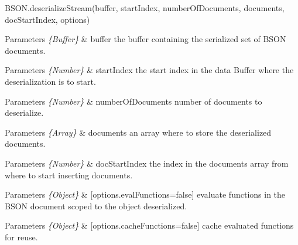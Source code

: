 \begin{DoxyItemize}
\item {\ttfamily B\+S\+O\+N.\+deserialize\+Stream(buffer, start\+Index, number\+Of\+Documents, documents, doc\+Start\+Index, options)}
\begin{DoxyItemize}
\item 
\begin{DoxyParams}{Parameters}
{\em \{\+Buffer\}} & buffer the buffer containing the serialized set of B\+S\+ON documents.\\
\hline
\end{DoxyParams}

\item 
\begin{DoxyParams}{Parameters}
{\em \{\+Number\}} & start\+Index the start index in the data Buffer where the deserialization is to start.\\
\hline
\end{DoxyParams}

\item 
\begin{DoxyParams}{Parameters}
{\em \{\+Number\}} & number\+Of\+Documents number of documents to deserialize.\\
\hline
\end{DoxyParams}

\item 
\begin{DoxyParams}{Parameters}
{\em \{\+Array\}} & documents an array where to store the deserialized documents.\\
\hline
\end{DoxyParams}

\item 
\begin{DoxyParams}{Parameters}
{\em \{\+Number\}} & doc\+Start\+Index the index in the documents array from where to start inserting documents.\\
\hline
\end{DoxyParams}

\item 
\begin{DoxyParams}{Parameters}
{\em \{\+Object\}} & \mbox{[}options.\+eval\+Functions=false\mbox{]} evaluate functions in the B\+S\+ON document scoped to the object deserialized.\\
\hline
\end{DoxyParams}

\item 
\begin{DoxyParams}{Parameters}
{\em \{\+Object\}} & \mbox{[}options.\+cache\+Functions=false\mbox{]} cache evaluated functions for reuse.\\
\hline
\end{DoxyParams}


\end{DoxyItemize}
\end{DoxyItemize}
